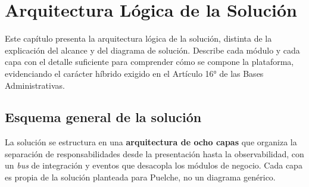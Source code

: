 \chapter{Arquitectura Lógica de la Solución}
\label{sec:arqlogica}

Este capítulo presenta la arquitectura lógica de la solución, distinta de la explicación
del alcance y del diagrama de solución. Describe cada módulo y cada capa con el detalle
suficiente para comprender cómo se compone la plataforma, evidenciando el carácter
híbrido exigido en el Artículo 16° de las Bases Administrativas.

\section{Esquema general de la solución}

La solución se estructura en una \textbf{arquitectura de ocho capas} que organiza la
separación de responsabilidades desde la presentación hasta la observabilidad, con un
\emph{bus} de integración y eventos que desacopla los módulos de negocio. Cada capa es
propia de la solución planteada para Puelche, no un diagrama genérico.



